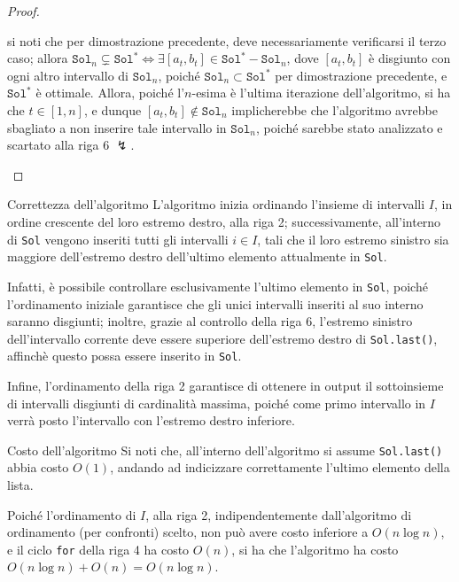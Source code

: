 \documentclass[a4paper, 12pt]{report}
\begin{document}
\begin{proof}
\begin{itemize}
                si noti che per dimostrazione precedente, deve necessariamente verificarsi il terzo caso; allora $\texttt{Sol}_n \subsetneq \texttt{Sol}^* \iff \exists[a_t, b_t] \in \texttt{Sol}^* - \texttt{Sol}_n$, dove $[a_t, b_t]$ è disgiunto con ogni altro intervallo di $\texttt{Sol}_n$, poiché $\texttt{Sol}_n \subset \texttt{Sol}^*$ per dimostrazione precedente, e $\texttt{Sol}^*$ è ottimale. Allora, poiché l'$n$-esima è l'ultima iterazione dell'algoritmo, si ha che $t \in [1, n]$, e dunque $[a_t, b_t] \notin \texttt{Sol}_n$ implicherebbe che l'algoritmo avrebbe sbagliato a non inserire tale intervallo in $\texttt{Sol}_n$, poiché sarebbe stato analizzato e scartato alla riga 6 $\lightning$.
        \end{itemize}
    \end{proof}

    \begin{framedobs}{Correttezza dell'algoritmo}
        L'algoritmo inizia ordinando l'insieme di intervalli $I$, in ordine crescente del loro estremo destro, alla riga 2; successivamente, all'interno di \texttt{Sol} vengono inseriti tutti gli intervalli $i \in I$, tali che il loro estremo sinistro sia maggiore dell'estremo destro dell'ultimo elemento attualmente in \texttt{Sol}.

        Infatti, è possibile controllare esclusivamente l'ultimo elemento in \texttt{Sol}, poiché l'ordinamento iniziale garantisce che gli unici intervalli inseriti al suo interno saranno disgiunti; inoltre, grazie al controllo della riga 6, l'estremo sinistro dell'intervallo corrente deve essere superiore dell'estremo destro di \texttt{Sol.last()}, affinchè questo possa essere inserito in \texttt{Sol}.

        Infine, l'ordinamento della riga 2 garantisce di ottenere in output il sottoinsieme di intervalli disgiunti di cardinalità massima, poiché come primo intervallo in $I$ verrà posto l'intervallo con l'estremo destro inferiore.
    \end{framedobs}

    \begin{framedobs}{Costo dell'algoritmo}
        Si noti che, all'interno dell'algoritmo si assume \texttt{Sol.last()} abbia costo $O(1)$, andando ad indicizzare correttamente l'ultimo elemento della lista.

        Poiché l'ordinamento di $I$, alla riga 2, indipendentemente dall'algoritmo di ordinamento (per confronti) scelto, non può avere costo inferiore a $O(n \log n)$, e il ciclo \texttt{for} della riga 4 ha costo $O(n)$, si ha che l'algoritmo ha costo $O(n \log n) + O(n) = O(n \log n)$.
    \end{framedobs}
\end{document}
